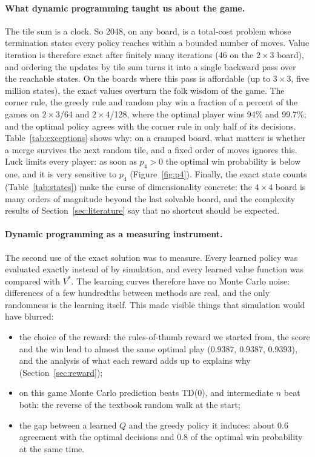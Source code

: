 \documentclass[11pt,a4paper]{article}
\theoremstyle{remark}
\begin{document}
\paragraph{What dynamic programming taught us about the game.} The tile sum is a clock. So 2048, on any board, is a total-cost problem whose termination states every policy reaches within a bounded number of moves. Value iteration is therefore exact after finitely many iterations (46 on the $2\times3$ board), and ordering the updates by tile sum turns it into a single backward pass over the reachable states. On the boards where this pass is affordable (up to $3\times3$, five million states), the exact values overturn the folk wisdom of the game. The corner rule, the greedy rule and random play win a fraction of a percent of the games on $2\times3$/64 and $2\times4$/128, where the optimal player wins 94\% and 99.7\%; and the optimal policy agrees with the corner rule in only half of its decisions. Table~\ref{tab:exceptions} shows why: on a cramped board, what matters is whether a merge survives the next random tile, and a fixed order of moves ignores this. Luck limits every player: as soon as $p_4>0$ the optimal win probability is below one, and it is very sensitive to $p_4$ (Figure~\ref{fig:p4}). Finally, the exact state counts (Table~\ref{tab:states}) make the curse of dimensionality concrete: the $4\times4$ board is many orders of magnitude beyond the last solvable board, and the complexity results of Section~\ref{sec:literature} say that no shortcut should be expected.

\paragraph{Dynamic programming as a measuring instrument.} The second use of the exact solution was to measure. Every learned policy was evaluated exactly instead of by simulation, and every learned value function was compared with $V^*$. The learning curves therefore have no Monte Carlo noise: differences of a few hundredths between methods are real, and the only randomness is the learning itself. This made visible things that simulation would have blurred:
\begin{itemize}[leftmargin=*]
\item the choice of the reward: the rules-of-thumb reward we started from, the score and the win lead to almost the same optimal play (0.9387, 0.9387, 0.9393), and the analysis of what each reward adds up to explains why (Section~\ref{sec:reward});
\item on this game Monte Carlo prediction beats TD(0), and intermediate $n$ beat both: the reverse of the textbook random walk at the start;
\item the gap between a learned $Q$ and the greedy policy it induces: about 0.6 agreement with the optimal decisions and 0.8 of the optimal win probability at the same time.
\end{itemize}
\end{document}
